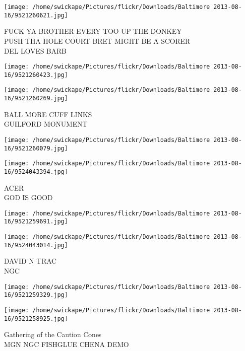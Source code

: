 \documentclass[10pt,letterpaper]{article}
\begin{document}
\texttt{[image: /home/swickape/Pictures/flickr/Downloads/Baltimore 2013-08-16/9521260621.jpg]}

FUCK YA BROTHER EVERY TOO UP THE DONKEY\\
PUSH THA HOLE COURT BRET MIGHT BE A SCORER\\
DEL LOVES BARB
\pagebreak

\texttt{[image: /home/swickape/Pictures/flickr/Downloads/Baltimore 2013-08-16/9521260423.jpg]}

\vspace{0.25in}
\texttt{[image: /home/swickape/Pictures/flickr/Downloads/Baltimore 2013-08-16/9521260269.jpg]}

BALL MORE CUFF LINKS\\
GUILFORD MONUMENT
\pagebreak

\texttt{[image: /home/swickape/Pictures/flickr/Downloads/Baltimore 2013-08-16/9521260079.jpg]}

\vspace{0.25in}
\texttt{[image: /home/swickape/Pictures/flickr/Downloads/Baltimore 2013-08-16/9524043394.jpg]}

ACER\\
GOD IS GOOD
\pagebreak

\texttt{[image: /home/swickape/Pictures/flickr/Downloads/Baltimore 2013-08-16/9521259691.jpg]}

\vspace{0.25in}
\texttt{[image: /home/swickape/Pictures/flickr/Downloads/Baltimore 2013-08-16/9524043014.jpg]}

DAVID N TRAC\\
NGC
\pagebreak

\texttt{[image: /home/swickape/Pictures/flickr/Downloads/Baltimore 2013-08-16/9521259329.jpg]}

\vspace{0.25in}
\texttt{[image: /home/swickape/Pictures/flickr/Downloads/Baltimore 2013-08-16/9521258925.jpg]}

Gathering of the Caution Cones\\
MGN NGC FISHGLUE CHENA DEMO
\pagebreak
\end{document}
